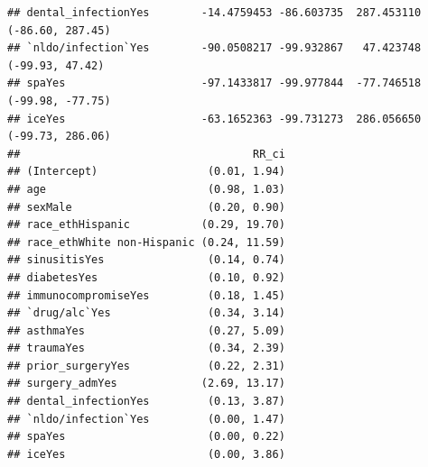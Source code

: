 \documentclass[
]{article}
\begin{document}
\begin{verbatim}
## dental_infectionYes        -14.4759453 -86.603735  287.453110  (-86.60, 287.45)
## `nldo/infection`Yes        -90.0508217 -99.932867   47.423748   (-99.93, 47.42)
## spaYes                     -97.1433817 -99.977844  -77.746518  (-99.98, -77.75)
## iceYes                     -63.1652363 -99.731273  286.056650  (-99.73, 286.06)
##                                    RR_ci
## (Intercept)                 (0.01, 1.94)
## age                         (0.98, 1.03)
## sexMale                     (0.20, 0.90)
## race_ethHispanic           (0.29, 19.70)
## race_ethWhite non-Hispanic (0.24, 11.59)
## sinusitisYes                (0.14, 0.74)
## diabetesYes                 (0.10, 0.92)
## immunocompromiseYes         (0.18, 1.45)
## `drug/alc`Yes               (0.34, 3.14)
## asthmaYes                   (0.27, 5.09)
## traumaYes                   (0.34, 2.39)
## prior_surgeryYes            (0.22, 2.31)
## surgery_admYes             (2.69, 13.17)
## dental_infectionYes         (0.13, 3.87)
## `nldo/infection`Yes         (0.00, 1.47)
## spaYes                      (0.00, 0.22)
## iceYes                      (0.00, 3.86)
\end{verbatim}
\end{document}
